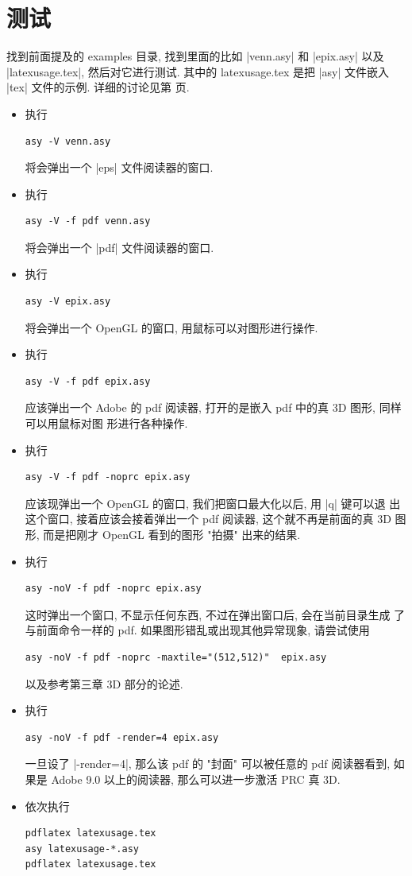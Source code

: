 \documentclass[nofonts,CJKnormalspaces]{ctexbook}
\begin{document}
\section{测试}
找到前面提及的 examples 目录, 找到里面的比如 |venn.asy| 和 |epix.asy|
以及 |latexusage.tex|, 然后对它进行测试. 其中的 latexusage.tex 是把
|asy| 文件嵌入 |tex| 文件的示例. 详细的讨论见第 \pageref{asy:latexmk}
页.
\begin{itemize}
\item 执行
\begin{verbatim}
asy -V venn.asy
\end{verbatim}
  将会弹出一个 |eps| 文件阅读器的窗口.
\item 执行
\begin{verbatim}
asy -V -f pdf venn.asy
\end{verbatim}
  将会弹出一个 |pdf| 文件阅读器的窗口.
\item 执行
\begin{verbatim}
asy -V epix.asy
\end{verbatim}
  将会弹出一个 OpenGL 的窗口, 用鼠标可以对图形进行操作.
\item 执行
\begin{verbatim}
asy -V -f pdf epix.asy
\end{verbatim}
  应该弹出一个 Adobe 的 pdf 阅读器, 打开的是嵌入 pdf 中的真 3D 图形, 同样可以用鼠标对图
  形进行各种操作.
\item 执行
\begin{verbatim}
asy -V -f pdf -noprc epix.asy
\end{verbatim}
  应该现弹出一个 OpenGL 的窗口, 我们把窗口最大化以后, 用 |q| 键可以退
  出这个窗口, 接着应该会接着弹出一个 pdf 阅读器, 这个就不再是前面的真
  3D 图形, 而是把刚才 OpenGL 看到的图形 "拍摄" 出来的结果.
\item 执行
\begin{verbatim}
asy -noV -f pdf -noprc epix.asy
\end{verbatim}
  这时弹出一个窗口, 不显示任何东西, 不过在弹出窗口后, 会在当前目录生成
  了与前面命令一样的 pdf. 如果图形错乱或出现其他异常现象, 请尝试使用
\begin{verbatim}
asy -noV -f pdf -noprc -maxtile="(512,512)"  epix.asy
\end{verbatim}
  以及参考第三章 3D 部分的论述.
\item 执行
\begin{verbatim}
asy -noV -f pdf -render=4 epix.asy
\end{verbatim}
  一旦设了 |-render=4|, 那么该 pdf 的 "封面" 可以被任意的 pdf 阅读器看到, 如果是
  Adobe 9.0 以上的阅读器, 那么可以进一步激活 PRC 真 3D.

\item 依次执行
\begin{verbatim}
pdflatex latexusage.tex
asy latexusage-*.asy
pdflatex latexusage.tex
\end{verbatim}

\end{itemize}
\end{document}
